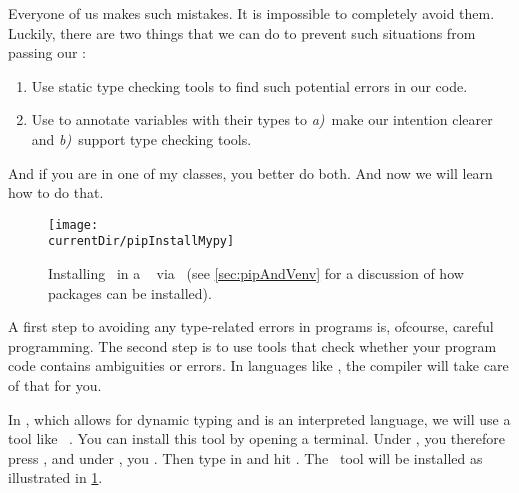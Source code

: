 Everyone of us makes such mistakes.
It is impossible to completely avoid them.
Luckily, there are two things that we can do to prevent such situations from passing our :%
%
\begin{enumerate}%
%
\item Use static type checking tools to find such potential errors in our code.%
%
\item Use  to annotate variables with their types to \emph{a)}~make our intention clearer and \emph{b)}~support type checking tools.%
%
\end{enumerate}%
%
And if you are in one of my classes, you better do both.
And now we will learn how to do that.%
\endhsection%
%
%
%
%
\begin{figure}%
\centering%
\texttt{[image: \\currentDir/pipInstallMypy]}%
\caption{Installing \mypy\ in a \ubuntu\  via \pip~(see \cref{sec:pipAndVenv} for a discussion of how packages can be installed).}%
\label{fig:pipInstallMypy}%
\end{figure}%
%
%
%
%
%
A first step to avoiding any type-related errors in programs is, ofcourse, careful programming.
The second step is to use tools that check whether your program code contains ambiguities or errors.
In languages like , the compiler will take care of that for you.

In \python, which allows for dynamic typing and is an interpreted language, we will use a tool like \mypy~\cite{LLHSVRZSJYYMC2024MOSTFP}.
You can install this tool by opening a terminal.
Under \ubuntu, you therefore press \ubuntuTerminal, and under \windows, you \windowsTerminal.
Then type in  and hit \keys{\enter}.
The \mypy\ tool will be installed as illustrated in \cref{fig:pipInstallMypy}.

